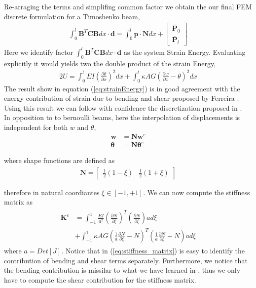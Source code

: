 \documentclass[10pt,twoside,a4paper]{article}
\renewcommand{\vec}[1]{\mathbf{#1}}
\begin{document}
Re-arraging the terms and simplifing common factor we obtain the our final FEM discrete formulation for a Timoshenko beam,
\begin{align}
	\int_0^l \vec{B}^T \vec{C} \vec{B} dx \cdot \vec{d} =
 	\int_0^l \vec{p} \cdot \vec{N} dx +
	\begin{bmatrix}
	 \bar{\vec{P}}_0 \\
	 \bar{\vec{P}}_l
	\end{bmatrix}	
\end{align}
Here we identify factor $\int_0^l \vec{B}^T \vec{C} \vec{B} dx \cdot \vec{d}$ as the system Strain Energy. Evaluating explicitly it would yields two the double product of the strain Energy,
\begin{align}
	2U = \int_0^l EI  \left( \frac{\partial \theta}{\partial x} \right)^2 dx
	+ \int_0^l \kappa AG \left( \frac{\partial w}{\partial x} - \theta \right)^2 dx  
\label{eq:strainEnergy}
\end{align}
The result show in equation (\ref{eq:strainEnergy}) is in good agreement with the energy contribution of strain due to bending and shear proposed by Ferreira \cite{ferreira2007}. Using this result we can follow with confidence the discretization proposed in \cite{ferreira2007}.\\

In opposition to to bernoulli beams, here the interpolation of displacements is independent for both $w$ and $\theta$,
\begin{align}
  \vec{w}  &= \vec{N} \vec{w}^e \\
  \vec{\theta}  &= \vec{N} \vec{\theta}^e
\end{align}

where shape functions are defined as
\begin{align}
  \vec{N} =
  \begin{bmatrix}
   \frac{1}{2}(1 - \xi) & \frac{1}{2}(1 + \xi)
  \end{bmatrix}
\end{align}

therefore in natural coordiantes $\xi \in [-1,+1]$. We can now compute the stiffness matrix as
\begin{align}
  \begin{split}
  \vec{K}^e &= \int_{-1}^{1} \frac{EI}{a^2} 
	\left( \frac{\partial N}{\partial \xi} \right)^T 
	\left( \frac{\partial N}{\partial \xi} \right) a d\xi \\
	  &+ \int_{-1}^{1} \kappa AG 
	\left( \frac{1}{a} \frac{\partial N}{\partial \xi} -N \right)^T 
	\left( \frac{1}{a} \frac{\partial N}{\partial \xi} -N \right) a d\xi
  \end{split}
\label{eq:stiffness_matrix}
\end{align}
where $a = Det[J]$. 
Notice that in (\ref{eq:stiffness_matrix}) is easy to identify the contribution of bending and shear terms separately. Furthermore, we notice that the bending contribution is missilar to what we have learned in \cite{Chen2013}, thus we only have to compute the shear contribution for the stiffness matrix.
\end{document}

